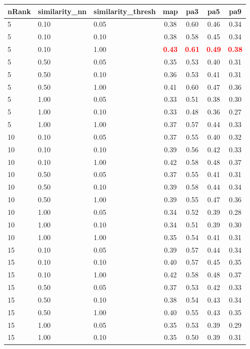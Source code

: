 \begin{tabular}{lllcccc} 
nRank & similarity\_nn & similarity\_thresh & map & pa3 & pa5 & pa9 \\ 
\hline 
 5 & 0.10 & 0.05 & 0.38 & 0.60 & 0.46 & 0.34 \\ 
 5 & 0.10 & 0.10 & 0.38 & 0.58 & 0.45 & 0.34 \\ 
 5 & 0.10 & 1.00 & \textbf{\textcolor{red}{0.43}} & \textbf{\textcolor{red}{0.61}} & \textbf{\textcolor{red}{0.49}} & \textbf{\textcolor{red}{0.38}} \\ 
 5 & 0.50 & 0.05 & 0.35 & 0.53 & 0.40 & 0.31 \\ 
 5 & 0.50 & 0.10 & 0.36 & 0.53 & 0.41 & 0.31 \\ 
 5 & 0.50 & 1.00 & 0.41 & 0.60 & 0.47 & 0.36 \\ 
 5 & 1.00 & 0.05 & 0.33 & 0.51 & 0.38 & 0.30 \\ 
 5 & 1.00 & 0.10 & 0.33 & 0.48 & 0.36 & 0.27 \\ 
 5 & 1.00 & 1.00 & 0.37 & 0.57 & 0.44 & 0.33 \\ 
10 & 0.10 & 0.05 & 0.37 & 0.55 & 0.40 & 0.32 \\ 
10 & 0.10 & 0.10 & 0.39 & 0.56 & 0.42 & 0.33 \\ 
10 & 0.10 & 1.00 & 0.42 & 0.58 & 0.48 & 0.37 \\ 
10 & 0.50 & 0.05 & 0.37 & 0.55 & 0.41 & 0.31 \\ 
10 & 0.50 & 0.10 & 0.39 & 0.58 & 0.44 & 0.34 \\ 
10 & 0.50 & 1.00 & 0.39 & 0.55 & 0.47 & 0.36 \\ 
10 & 1.00 & 0.05 & 0.34 & 0.52 & 0.39 & 0.28 \\ 
10 & 1.00 & 0.10 & 0.34 & 0.51 & 0.39 & 0.30 \\ 
10 & 1.00 & 1.00 & 0.35 & 0.54 & 0.41 & 0.31 \\ 
15 & 0.10 & 0.05 & 0.39 & 0.57 & 0.44 & 0.34 \\ 
15 & 0.10 & 0.10 & 0.40 & 0.57 & 0.45 & 0.35 \\ 
15 & 0.10 & 1.00 & 0.42 & 0.58 & 0.48 & 0.37 \\ 
15 & 0.50 & 0.05 & 0.37 & 0.53 & 0.42 & 0.33 \\ 
15 & 0.50 & 0.10 & 0.38 & 0.54 & 0.43 & 0.34 \\ 
15 & 0.50 & 1.00 & 0.40 & 0.55 & 0.43 & 0.35 \\ 
15 & 1.00 & 0.05 & 0.35 & 0.53 & 0.39 & 0.29 \\ 
15 & 1.00 & 0.10 & 0.35 & 0.50 & 0.39 & 0.31 \\ 

\end{tabular}
